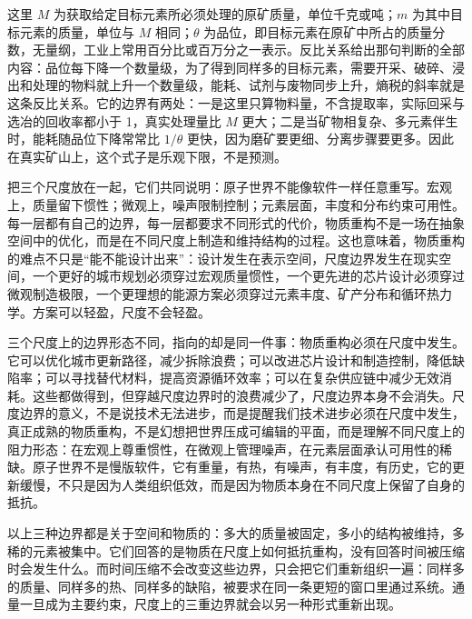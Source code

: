 这里 $M$ 为获取给定目标元素所必须处理的原矿质量，单位千克或吨；$m$ 为其中目标元素的质量，单位与 $M$ 相同；$\theta$ 为品位，即目标元素在原矿中所占的质量分数，无量纲，工业上常用百分比或百万分之一表示。反比关系给出那句判断的全部内容：品位每下降一个数量级，为了得到同样多的目标元素，需要开采、破碎、浸出和处理的物料就上升一个数量级，能耗、试剂与废物同步上升，熵税的斜率就是这条反比关系。它的边界有两处：一是这里只算物料量，不含提取率，实际回采与选冶的回收率都小于 1，真实处理量比 $M$ 更大；二是当矿物相复杂、多元素伴生时，能耗随品位下降常常比 $1/\theta$ 更快，因为磨矿要更细、分离步骤要更多。因此在真实矿山上，这个式子是乐观下限，不是预测。


把三个尺度放在一起，它们共同说明：原子世界不能像软件一样任意重写。宏观上，质量留下惯性；微观上，噪声限制控制；元素层面，丰度和分布约束可用性。每一层都有自己的边界，每一层都要求不同形式的代价，物质重构不是一场在抽象空间中的优化，而是在不同尺度上制造和维持结构的过程。这也意味着，物质重构的难点不只是“能不能设计出来”：设计发生在表示空间，尺度边界发生在现实空间，一个更好的城市规划必须穿过宏观质量惯性，一个更先进的芯片设计必须穿过微观制造极限，一个更理想的能源方案必须穿过元素丰度、矿产分布和循环热力学。方案可以轻盈，尺度不会轻盈。

三个尺度上的边界形态不同，指向的却是同一件事：物质重构必须在尺度中发生。它可以优化城市更新路径，减少拆除浪费；可以改进芯片设计和制造控制，降低缺陷率；可以寻找替代材料，提高资源循环效率；可以在复杂供应链中减少无效消耗。这些都做得到，但穿越尺度边界时的浪费减少了，尺度边界本身不会消失。尺度边界的意义，不是说技术无法进步，而是提醒我们技术进步必须在尺度中发生，真正成熟的物质重构，不是幻想把世界压成可编辑的平面，而是理解不同尺度上的阻力形态：在宏观上尊重惯性，在微观上管理噪声，在元素层面承认可用性的稀缺。原子世界不是慢版软件，它有重量，有热，有噪声，有丰度，有历史，它的更新缓慢，不只是因为人类组织低效，而是因为物质本身在不同尺度上保留了自身的抵抗。

以上三种边界都是关于空间和物质的：多大的质量被固定，多小的结构被维持，多稀的元素被集中。它们回答的是物质在尺度上如何抵抗重构，没有回答时间被压缩时会发生什么。而时间压缩不会改变这些边界，只会把它们重新组织一遍：同样多的质量、同样多的热、同样多的缺陷，被要求在同一条更短的窗口里通过系统。通量一旦成为主要约束，尺度上的三重边界就会以另一种形式重新出现。



